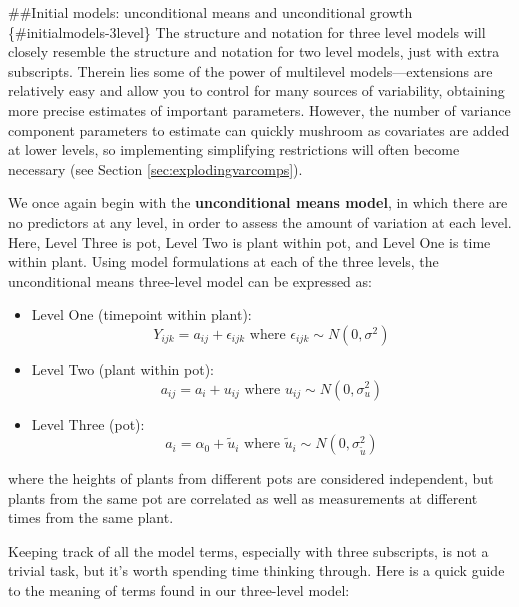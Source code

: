 \documentclass[
]{krantz}
\providecommand{\tightlist}{%
  \setlength{\itemsep}{0pt}\setlength{\parskip}{0pt}}
\begin{document}
\#\#Initial models: unconditional means and unconditional growth \{\#initialmodels-3level\}
The structure and notation for three level models will closely resemble the structure and notation for two level models, just with extra subscripts. Therein lies some of the power of multilevel models---extensions are relatively easy and allow you to control for many sources of variability, obtaining more precise estimates of important parameters. However, the number of variance component parameters to estimate can quickly mushroom as covariates are added at lower levels, so implementing simplifying restrictions will often become necessary (see Section \ref{sec:explodingvarcomps}).

We once again begin with the \textbf{unconditional means model}, in which there are no predictors at any level, in order to assess the amount of variation at each level. Here, Level Three is pot, Level Two is plant within pot, and Level One is time within plant. Using model formulations at each of the three levels, the unconditional means three-level model can be expressed as:

\begin{itemize}
\tightlist
\item
  Level One (timepoint within plant):
  \begin{equation}
  Y_{ijk} = a_{ij}+\epsilon_{ijk} \textrm{ where } \epsilon_{ijk}\sim N(0,\sigma^2)
  \label{eq:initunun}
  \end{equation}
\item
  Level Two (plant within pot):
  \begin{equation}
  a_{ij} = a_{i}+u_{ij} \textrm{ where } u_{ij}\sim N(0,\sigma_{u}^{2})
  \label{eq:initunun2}
  \end{equation}
\item
  Level Three (pot):
  \begin{equation}
  a_{i} = \alpha_{0}+\tilde{u}_{i} \textrm{ where } \tilde{u}_{i} \sim N(0,\sigma_{\tilde{u}}^{2})
  \label{eq:initunun3}
  \end{equation}
\end{itemize}

where the heights of plants from different pots are considered independent, but plants from the same pot are correlated as well as measurements at different times from the same plant.

Keeping track of all the model terms, especially with three subscripts, is not a trivial task, but it's worth spending time thinking through. Here is a quick guide to the meaning of terms found in our three-level model:
\end{document}
